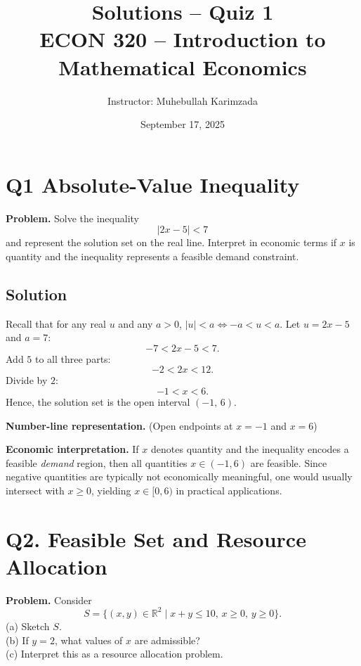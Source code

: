 \documentclass[12pt]{article}
\title{Solutions -- Quiz 1\\ \vspace{10pt}
\large ECON 320 -- Introduction to Mathematical Economics}
\author{Instructor: Muhebullah Karimzada}
\date{September 17, 2025}
\begin{document}
\maketitle

\section*{Q1 Absolute-Value Inequality}
\textbf{Problem. } Solve the inequality
\[
|2x - 5| < 7
\]
and represent the solution set on the real line. Interpret in economic terms if $x$ is quantity and the inequality represents a feasible demand constraint.

\subsection*{Solution}
Recall that for any real $u$ and any $a>0$, $|u|<a \iff -a < u < a$. Let $u=2x-5$ and $a=7$:
\[
-7 < 2x - 5 < 7.
\]
Add $5$ to all three parts:
\[
-2 < 2x < 12.
\]
Divide by $2$:
\[
-1 < x < 6.
\]
Hence, the solution set is the open interval $(-1,\,6)$.

\medskip
\noindent \textbf{Number-line representation.} (Open endpoints at $x=-1$ and $x=6$)
\begin{center}
\end{center}

\noindent \textbf{Economic interpretation.} If $x$ denotes quantity and the inequality encodes a feasible \emph{demand} region, then all quantities $x\in(-1,6)$ are feasible. Since negative quantities are typically not economically meaningful, one would usually intersect with $x\ge 0$, yielding $x\in[0,6)$ in practical applications.

\bigskip

\section*{Q2.  Feasible Set and Resource Allocation}
\textbf{Problem. } Consider
\[
S = \{ (x,y) \in \mathbb{R}^2 \mid x + y \leq 10, \, x \geq 0, \, y \geq 0 \}.
\]
(a) Sketch $S$. \;\\
(b) If $y=2$, what values of $x$ are admissible? \;\\
(c) Interpret this as a resource allocation problem.
\end{document}
